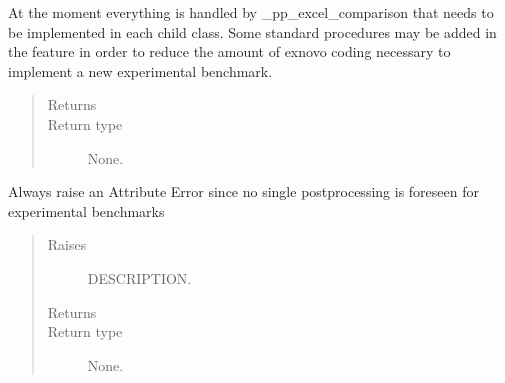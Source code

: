 \documentclass[letterpaper,10pt,english]{sphinxmanual}
\begin{document}
\begin{fulllineitems}
\begin{fulllineitems}
\label{\detokenize{api/postprocessing:expoutput.ExperimentalOutput.pp_excel_comparison}}
At the moment everything is handled by \_pp\_excel\_comparison that needs
to be implemented in each child class. Some standard procedures may be
added in the feature in order to reduce the amount of ex\sphinxhyphen{}novo coding
necessary to implement a new experimental benchmark.
\begin{quote}\begin{description}
\item[{Returns}] \leavevmode


\item[{Return type}] \leavevmode
None.

\end{description}\end{quote}

\end{fulllineitems}


\begin{fulllineitems}
\label{\detokenize{api/postprocessing:expoutput.ExperimentalOutput.single_postprocess}}
Always raise an Attribute Error since no single post\sphinxhyphen{}processing is
foreseen for experimental benchmarks
\begin{quote}\begin{description}
\item[{Raises}] \leavevmode
{} \textendash{} DESCRIPTION.

\item[{Returns}] \leavevmode


\item[{Return type}] \leavevmode
None.

\end{description}\end{quote}

\end{fulllineitems}


\end{fulllineitems}
\end{document}
